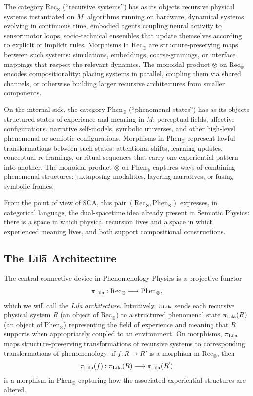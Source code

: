 \documentclass[12]{amsart}
\theoremstyle{plain}
\begin{document}
The category $\text{Rec}_\otimes$ (``recursive systems'') has as its objects recursive physical systems instantiated on $M$: algorithms running on hardware, dynamical systems evolving in continuous time, embodied agents coupling neural activity to sensorimotor loops, socio-technical ensembles that update themselves according to explicit or implicit rules. Morphisms in $\text{Rec}_\otimes$ are structure-preserving maps between such systems: simulations, embeddings, coarse-grainings, or interface mappings that respect the relevant dynamics. The monoidal product $\otimes$ on $\text{Rec}_\otimes$ encodes compositionality: placing systems in parallel, coupling them via shared channels, or otherwise building larger recursive architectures from smaller components.

On the internal side, the category $\text{Phen}_\otimes$ (``phenomenal states'') has as its objects structured states of experience and meaning in $\tilde M$: perceptual fields, affective configurations, narrative self-models, symbolic universes, and other high-level phenomenal or semiotic configurations. Morphisms in $\text{Phen}_\otimes$ represent lawful transformations between such states: attentional shifts, learning updates, conceptual re-framings, or ritual sequences that carry one experiential pattern into another. The monoidal product $\otimes$ on $\text{Phen}_\otimes$ captures ways of combining phenomenal structures: juxtaposing modalities, layering narratives, or fusing symbolic frames.

From the point of view of SCA, this pair $(\text{Rec}_\otimes,\text{Phen}_\otimes)$ expresses, in categorical language, the dual-spacetime idea already present in Semiotic Physics: there is a space in which physical recursion lives and a space in which experienced meaning lives, and both support compositional constructions.

\subsection{The L\={\i}lā Architecture}

The central connective device in Phenomenology Physics is a projective functor
\[
  \pi_{\text{L\={\i}la}} : \text{Rec}_\otimes \longrightarrow \text{Phen}_\otimes,
\]
which we will call the \emph{L\={\i}lā architecture}. Intuitively, $\pi_{\text{L\={\i}la}}$ sends each recursive physical system $R$ (an object of $\text{Rec}_\otimes$) to a structured phenomenal state $\pi_{\text{L\={\i}la}}(R)$ (an object of $\text{Phen}_\otimes$) representing the field of experience and meaning that $R$ supports when appropriately coupled to an environment. On morphisms, $\pi_{\text{L\={\i}la}}$ maps structure-preserving transformations of recursive systems to corresponding transformations of phenomenology: if $f : R \to R'$ is a morphism in $\text{Rec}_\otimes$, then
\[
  \pi_{\text{L\={\i}la}}(f) : \pi_{\text{L\={\i}la}}(R) \longrightarrow \pi_{\text{L\={\i}la}}(R')
\]
is a morphism in $\text{Phen}_\otimes$ capturing how the associated experiential structures are altered.
\end{document}
